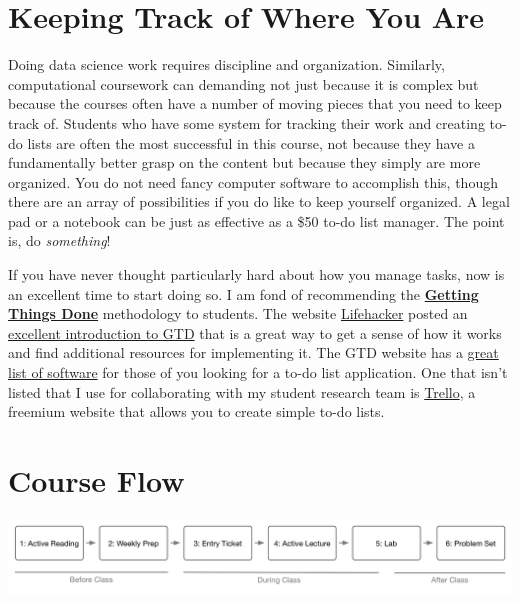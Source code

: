 \documentclass[]{book}
\theoremstyle{definition}
\theoremstyle{definition}
\theoremstyle{definition}
\theoremstyle{remark}
\begin{document}
\section{Keeping Track of Where You
Are}\label{keeping-track-of-where-you-are}

Doing data science work requires discipline and organization. Similarly,
computational coursework can demanding not just because it is complex
but because the courses often have a number of moving pieces that you
need to keep track of. Students who have some system for tracking their
work and creating to-do lists are often the most successful in this
course, not because they have a fundamentally better grasp on the
content but because they simply are more organized. You do not need
fancy computer software to accomplish this, though there are an array of
possibilities if you do like to keep yourself organized. A legal pad or
a notebook can be just as effective as a \$50 to-do list manager. The
point is, do \emph{something}!

If you have never thought particularly hard about how you manage tasks,
now is an excellent time to start doing so. I am fond of recommending
the \href{http://gettingthingsdone.com}{\textbf{Getting Things Done}}
methodology to students. The website
\href{https://lifehacker.com}{Lifehacker} posted an
\href{https://lifehacker.com/productivity-101-a-primer-to-the-getting-things-done-1551880955}{excellent
introduction to GTD} that is a great way to get a sense of how it works
and find additional resources for implementing it. The GTD website has a
\href{http://gettingthingsdone.com/common-tools-software/}{great list of
software} for those of you looking for a to-do list application. One
that isn't listed that I use for collaborating with my student research
team is \href{https://trello.com}{Trello}, a freemium website that
allows you to create simple to-do lists.

\section{Course Flow}\label{course-flow}

\begin{center}\includegraphics[width=1\linewidth]{images/courseWorkflow} \end{center}
\end{document}
